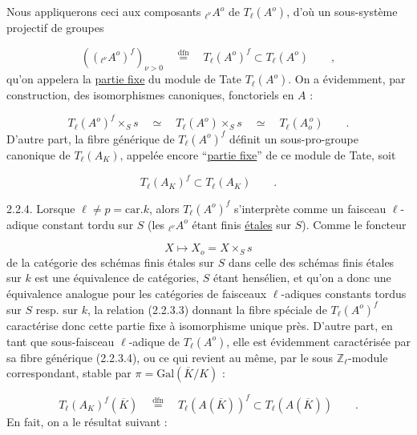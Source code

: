 Nous appliquerons ceci aux composants ${}_{\ell^{\nu}}A^{o}$ de $T_{\ell}(A^{o})$, d'où un sous-système projectif de groupes

\begin{equation}\tag{2.2.3.2}
(({}_{\ell^{\nu}}A^{o})^{f})_{\nu > 0} \quad \stackrel{\mathrm{dfn}}{=} \quad T_{\ell}(A^{o})^{f} \subset T_{\ell}(A^{o}) \qquad ,
\end{equation}
qu'on appelera la \underline{partie fixe} du module de Tate $T_{\ell}(A^{o})$. On a évidemment, par construction, des isomorphismes canoniques, fonctoriels en $A$ :

\begin{equation}\tag{2.2.3.3}
T_{\ell}(A^{o})^{f} \times_{S} s \quad \simeq \quad T_{\ell}(A^{o}) \times_{S} s \quad \simeq \quad T_{\ell}(A_{o}^{\,o}) \qquad .
\end{equation}
D'autre part, la fibre générique de $T_{\ell}(A^{o})^{f}$ définit un sous-pro-groupe canonique de $T_{\ell}(A_{K})$, appelée encore ``\underline{partie fixe}'' de ce module de Tate, soit

\begin{equation}\tag{2.2.3.4}
T_{\ell}(A_{K})^{f} \subset T_{\ell}(A_{K}) \qquad .
\end{equation}


2.2.4. Lorsque $\ell \neq p = \mathrm{car}.k$, alors $T_{\ell}(A^{o})^{f}$ s'interprète comme un faisceau $\ell$-adique constant tordu sur $S$ (les ${}_{\ell^{\nu}}A^{o}$ étant finis \underline{étales} sur $S$). Comme le foncteur

\begin{equation*}
X \longmapsto X_{o} = X \times_{S} s
\end{equation*}
de la catégorie des schémas finis étales sur $S$ dans celle des schémas finis étales sur $k$ est une équivalence de catégories, $S$ étant hensélien, et qu'on a donc une équivalence analogue pour les catégories de faisceaux $\ell$-adiques constants tordus sur $S$ resp. sur $k$, la relation (2.2.3.3) donnant la fibre spéciale de $T_{\ell}(A^{o})^{f}$ caractérise donc cette partie fixe à isomorphisme unique près. D'autre part, en tant que sous-faisceau $\ell$-adique de $T_{\ell}(A^{o})$, elle est évidemment caractérisée par sa fibre générique (2.2.3.4), ou ce qui revient au même, par le sous $\mathbb{Z}_{\ell}$-module correspondant, stable par $\pi = \mathrm{Gal}(\overline{K}/K)$ :

\begin{equation}\tag{2.2.4.1}
T_{\ell}(A_{K})^{f}(\overline{K}) \quad \stackrel{\mathrm{dfn}}{=} \quad T_{\ell}(A(\overline{K}))^{f} \subset T_{\ell}(A(\overline{K})) \qquad .
\end{equation}
En fait, on a le résultat suivant :

